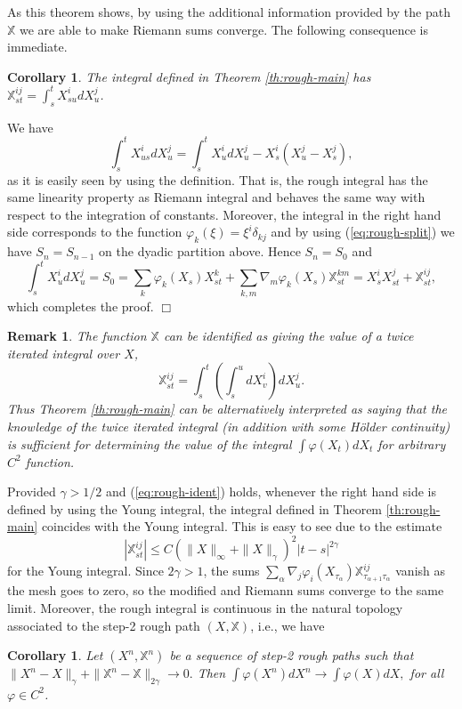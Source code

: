 \documentclass[a4paper,11pt]{article}
\newtheorem{corollary}[theorem]{Corollary}
\newtheorem{remark}[theorem]{Remark}
\newenvironment{proof}[1][Proof]{{\sc #1.} }{\hfill $\Box$}
\newcounter {constant}
\begin{document}
\medskip
As this theorem shows, by using the additional information provided by 
the path $\mathbb{X}$ we are able to make Riemann sums converge. The 
following consequence is immediate.
\begin{corollary}
The integral defined in Theorem \ref{th:rough-main} has
$
\mathbb{X}_{st}^{ij} = \int_{s}^t X^i_{su} dX^j_u
$.  
\end{corollary}
\begin{proof}
We have
$$
\int_{s}^t X^{i}_{us} dX^j_u = \int_{s}^t X^i_{u} dX^j_u - X^i_s 
(X^j_u-X^j_s),
$$ 
as it is easily seen by using the definition. That is, the rough 
integral has the same linearity property as Riemann integral and
behaves the same way with respect to the integration of constants. 
Moreover, the integral in the right hand side corresponds to the 
function $\varphi_k(\xi) = \xi^i \delta_{kj}$ and by using 
(\ref{eq:rough-split}) we have $S_{n}=S_{n-1}$ on the dyadic partition 
above. Hence $S_n = S_0$ and 
$$
\int_{s}^t X^i_{u} dX^j_u = S_0 = \sum_k \varphi_k(X_s) X^k_{st} +
\sum_{k,m} \nabla_m \varphi_k(X_s) \mathbb{X}_{st}^{km} = X_s^i
X^j_{st} + \mathbb{X}_{st}^{ij},
$$
which completes the proof.
\end{proof}

\begin{remark}
\rm{
The function $\mathbb{X}$ can be identified as giving the value of a 
\emph{twice iterated integral} over $X$,
\begin{equation}
  \label{eq:rough-ident}
\mathbb{X}_{st}^{ij} = \int_s^t \left(\int_s^u dX^i_v\right) dX^j_u. 
\end{equation}
Thus Theorem \ref{th:rough-main} can be alternatively interpreted as 
saying that the knowledge of the twice iterated integral (in addition 
with some H\"older continuity) is sufficient for determining the value 
of the integral $\int \varphi(X_t)dX_t$ for arbitrary $C^2$ function.  
}
\end{remark}

Provided $\gamma > 1/2$ and (\ref{eq:rough-ident}) holds, whenever the
right hand side is defined by using the Young integral, the integral 
defined in Theorem \ref{th:rough-main} coincides with the Young
integral. This is easy to see due to the estimate 
$$
|\mathbb{X}_{st}^{ij}| \le C (\|X\|_{\infty}+\|X\|_\gamma)^2 
|t-s|^{2\gamma}
$$
for the Young integral. Since $2\gamma > 1 $, the sums
$
\sum_\alpha \nabla_j \varphi_i(X_{\tau_\alpha}) 
\mathbb{X}_{\tau_{\alpha+1} \tau_\alpha}^{ij} 
$
vanish as the mesh goes to zero, so the modified and Riemann sums 
converge to the same limit.
Moreover, the rough integral is continuous in the natural topology
associated to the step-2 rough path $(X,\mathbb{X})$, i.e., we have
\begin{corollary}
Let $(X^n,\mathbb{X}^n)$ be a sequence of step-2 rough paths such 
that
$
\|X^n - X\|_\gamma + \|\mathbb{X}^n-\mathbb{X}\|_{2\gamma} \to 0.
$  
Then
$
\int \varphi(X^n) dX^n \to \int \varphi(X) dX,
$
for all $\varphi \in C^2$.
\end{corollary}
\end{document}
